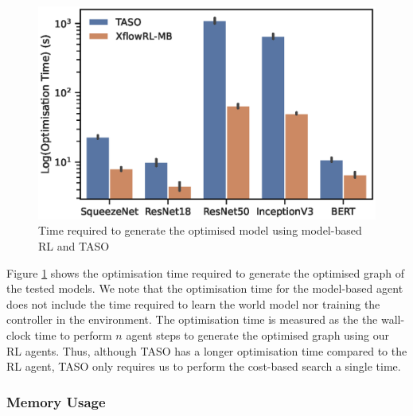 \begin{figure}[h]
  \centering
  \includegraphics[width=0.75\columnwidth]{sections/5evaluation/images/optimisation_time}
  \caption[Optimisation time for TASO and MB-RL]{Time required to generate the optimised model using  model-based RL and TASO}
  \label{fig:eval:optimisation-time}
\end{figure}

Figure \ref{fig:eval:optimisation-time} shows the optimisation time required to generate the optimised graph of the tested models. We note that the optimisation time for the model-based agent does not include the time required to learn the world model nor training the controller in the environment. The optimisation time is measured as the the wall-clock time to perform $n$ agent steps to generate the optimised graph using our RL agents. Thus, although TASO has a longer optimisation time compared to the RL agent, TASO only requires us to perform the cost-based search a single time.

\subsubsection{Memory Usage}

\begin{table}[htbp]
  \centering
  \caption[Memory usage of optimised graphs]{Relative performance improvement of the graphs optimised by the model-based agent. We show the inference time, and memory used for performing inference on the model.}
  \label{table:eval:graph-mem-usage}
\end{table}


